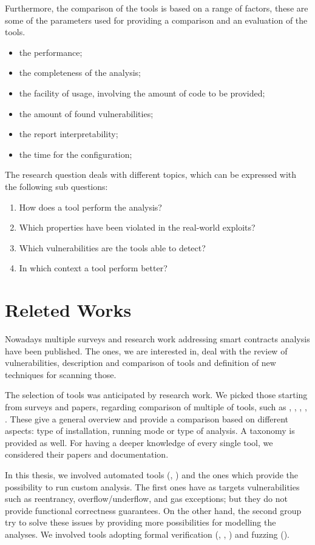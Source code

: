Furthermore, the comparison of the tools is based on a range of factors, these are some of the parameters used for providing a comparison and an evaluation of the tools.
\begin{itemize}
  \item the performance;
  \item the completeness of the analysis;
  \item the facility of usage, involving the amount of code to be provided;
  \item the amount of found vulnerabilities;
  \item the report interpretability;  
  \item the time for the configuration;
\end{itemize}  

The research question deals with different topics, which can be expressed with the following sub questions: 
\begin{enumerate}
  \item How does a tool perform the analysis? 
  \item Which properties have been violated in the real-world exploits? 
  \item Which vulnerabilities are the tools able to detect? 
  \item In which context a tool perform better?
\end{enumerate}


\section{Releted Works}
\label{sec:Introduction:ReletedWorks}
Nowadays multiple surveys and research work addressing smart contracts analysis have been published. 
The ones, we are interested in, deal with the review of vulnerabilities, description and comparison of tools and definition of new techniques for scanning those. 

The selection of tools was anticipated by research work. 
We picked those starting from surveys and papers, 
regarding comparison of multiple of tools, such as \citet{Survey1}, \citet{Survey2}, \citet{Survey3}, \citet{Survey4}, \citet{thesis}. 
These give a general overview and provide a comparison based on different aspects: type of installation, running mode or type of analysis. 
A taxonomy is provided as well. 
For having a deeper knowledge of every single tool, we considered their papers and documentation.

In this thesis, we involved automated tools (\citet{Slither}, \citet {Mythril}) and the ones which provide the possibility to run custom analysis.
The first ones have as targets vulnerabilities such as reentrancy, overflow/underflow, and gas exceptions; but they do not provide functional correctness guarantees. 
On the other hand, the second group try to solve these issues by providing more possibilities for modelling the analyses. 
We involved tools adopting formal verification (\citet{CertoraDocumentation}, \citet{SolcVerify}, \citet{CelestialPaper}) and fuzzing (\citet{Echidna}). 


